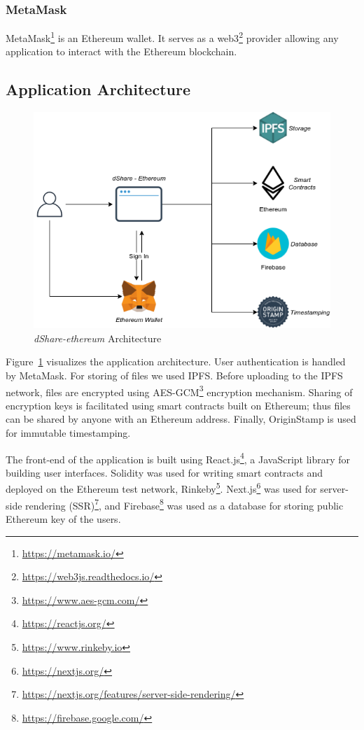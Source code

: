 			\subsubsection{MetaMask}
			MetaMask\footnote{\url{https://metamask.io/}} is an Ethereum wallet. It serves as a web3\footnote{\url{https://web3js.readthedocs.io/}} provider allowing any application to interact with the Ethereum blockchain.
			
		\subsection{Application Architecture}
		
			\begin{figure}[h]
				\includegraphics[width=\linewidth]{figures/dshare-ethereum}
				\caption{\label{fig:dshare-ethereum} \textit{dShare-ethereum} Architecture}
			\end{figure}
			
			Figure~\ref{fig:dshare-ethereum} visualizes the application architecture. User authentication is handled by MetaMask. For storing of files we used IPFS. Before uploading to the IPFS network, files are encrypted using AES-GCM\footnote{\url{https://www.aes-gcm.com/}} encryption mechanism. Sharing of encryption keys is facilitated using smart contracts built on Ethereum; thus files can be shared by anyone with an Ethereum address. Finally, OriginStamp is used for immutable timestamping.
			
			The front-end of the application is built using React.js\footnote{\url{https://reactjs.org/}}, a JavaScript library for building user interfaces. Solidity was used for writing smart contracts and deployed on the Ethereum test network, Rinkeby\footnote{\url{https://www.rinkeby.io}}. Next.js\footnote{\url{https://nextjs.org/}} was used for server-side rendering (SSR)\footnote{\url{https://nextjs.org/features/server-side-rendering/}}, and Firebase\footnote{\url{https://firebase.google.com/}} was used as a database for storing public Ethereum key of the users.
			
